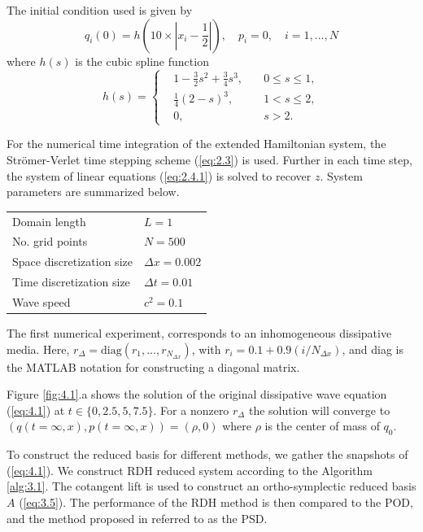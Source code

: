 The initial condition used is given by
\begin{equation} \label{eq:4.5}
	q_i(0) = h( 10\times|x_i - \frac{1}{2}| ), \quad p_i = 0, \quad i=1,\dots,N
\end{equation}
where $h(s)$ is the cubic spline function
\begin{equation} \label{eq:4.6}
h(s) = 
\left\{
\begin{aligned}
& 1 - \frac{3}{2}s^2 + \frac{3}{4}s^3, \quad & 0\leq s \leq 1, \\
& \frac{1}{4}(2-s)^3, & 1< s \leq 2, \\
& 0, & s > 2.
\end{aligned}
\right.
\end{equation}

For the numerical time integration of the extended Hamiltonian system, the Str\"omer-Verlet time stepping scheme (\ref{eq:2.3}) is used. Further in each time step, the system of linear equations (\ref{eq:2.4.1}) is solved to recover $z$. System parameters are summarized below.
\vspace{0.5cm}
\begin{center}
\begin{tabular}{|l|l|}
\hline
Domain length & $L = 1$ \\
No. grid points & $N = 500$ \\
Space discretization size & $\Delta x = 0.002$ \\
Time discretization size & $\Delta t = 0.01$ \\
Wave speed & $c^2 = 0.1$ \\
\hline
\end{tabular}
\end{center}
\vspace{0.5cm}

The first numerical experiment, corresponds to an inhomogeneous dissipative media. Here, $r_{\Delta} = \text{diag}(r_1,\dots,r_{N_{\Delta x}})$, with $r_i = 0.1 + 0.9(i/N_{\Delta x})$, and diag is the MATLAB notation for constructing a diagonal matrix.

Figure \ref{fig:4.1}.a shows the solution of the original dissipative wave equation (\ref{eq:4.1}) at $t \in \{0,2.5,5,7.5\}$. For a nonzero $r_\Delta$ the solution will converge to $(q(t=\infty,x),p(t=\infty,x)) = (\rho,0)$ where $\rho$ is the center of mass of $q_0$. 

To construct the reduced basis for different methods, we gather the snapshots of (\ref{eq:4.1}). We construct RDH reduced system according to the Algorithm \ref{alg:3.1}. The cotangent lift is used to construct an ortho-symplectic reduced basis $A$ (\ref{eq:3.5}). The performance of the RDH method is then compared to the POD, and the method proposed in \cite{peng2016geometric} referred to as the PSD.

